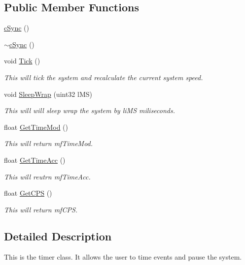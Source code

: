 \subsection*{Public Member Functions}
\begin{DoxyCompactItemize}
\item 
\hyperlink{classc_sync_aba0244265b49127f64ce61ba18d95373}{cSync} ()
\item 
\hyperlink{classc_sync_a6c112644cb433030b18a3379aabaf1f4}{$\sim$cSync} ()
\item 
void \hyperlink{classc_sync_ae0599d8020e8169a1a7a874a5b96499c}{Tick} ()
\begin{DoxyCompactList}\small\item\em This will tick the system and recalculate the current system speed. \item\end{DoxyCompactList}\item 
void \hyperlink{classc_sync_a59d51ce11e57b7829cbb00ec27b2869d}{SleepWrap} (uint32 lMS)
\begin{DoxyCompactList}\small\item\em This will will sleep wrap the system by liMS miliseconds. \item\end{DoxyCompactList}\item 
float \hyperlink{classc_sync_ac0a3f43667b9046a51860c2aa6140265}{GetTimeMod} ()
\begin{DoxyCompactList}\small\item\em This will return mfTimeMod. \item\end{DoxyCompactList}\item 
float \hyperlink{classc_sync_a44cc58ad37a1a59e4ccfcf1900ca0f61}{GetTimeAcc} ()
\begin{DoxyCompactList}\small\item\em This will reutrn mfTimeAcc. \item\end{DoxyCompactList}\item 
float \hyperlink{classc_sync_aab98fbafcb5f4a59d697b0225edaaa3c}{GetCPS} ()
\begin{DoxyCompactList}\small\item\em This will return mfCPS. \item\end{DoxyCompactList}\end{DoxyCompactItemize}


\subsection{Detailed Description}
This is the timer class. It allows the user to time events and pause the system. 


